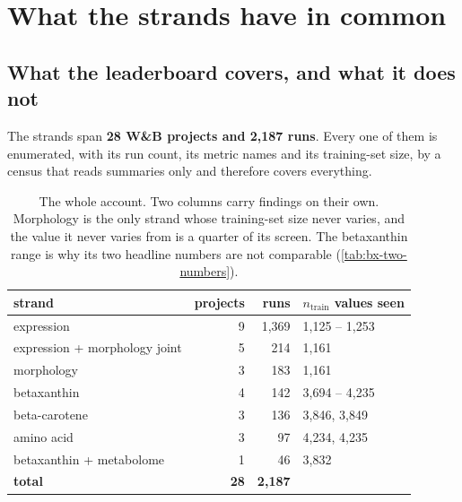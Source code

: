 
\section{What the strands have in common}
\label{sec:common}

\subsection{What the leaderboard covers, and what it does not}
\label{sec:coverage}

The strands span \textbf{28 W\&B projects and 2,187 runs}. Every one of them is enumerated,
with its run count, its metric names and its training-set size, by a census that reads
summaries only and therefore covers everything.

\begin{table}[htbp]
\centering\small
\begin{tabular}{lrrl}
\toprule
strand & projects & runs & $n_{\mathrm{train}}$ values seen \\
\midrule
expression                   & 9 & 1{,}369 & 1{,}125 -- 1{,}253 \\
expression + morphology joint & 5 &   214 & 1{,}161 \\
morphology                   & 3 &   183 & 1{,}161 \\
betaxanthin                  & 4 &   142 & 3{,}694 -- 4{,}235 \\
beta-carotene                & 3 &   136 & 3{,}846, 3{,}849 \\
amino acid                   & 3 &    97 & 4{,}234, 4{,}235 \\
betaxanthin + metabolome     & 1 &    46 & 3{,}832 \\
\midrule
\textbf{total}               & \textbf{28} & \textbf{2{,}187} & \\
\bottomrule
\end{tabular}
\caption[]{The whole account. Two columns carry findings on their own. Morphology is the
only strand whose training-set size never varies, and the value it never varies from is a
quarter of its screen. The betaxanthin range is why its two headline numbers are not
comparable (\cref{tab:bx-two-numbers}).}
\label{tab:project-census}
\end{table}

